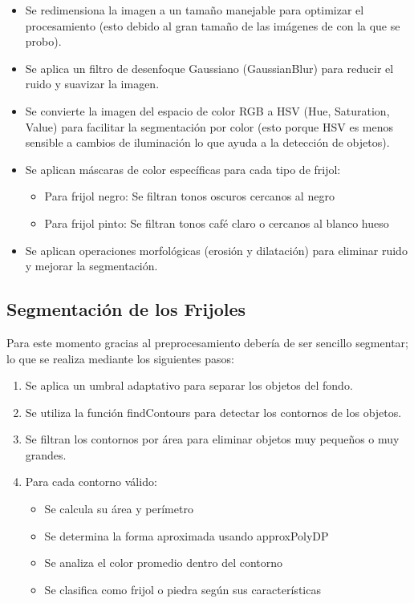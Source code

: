 \documentclass[conference]{IEEEtran}
\begin{document}
    \begin{itemize}
        \item Se redimensiona la imagen a un tamaño manejable para optimizar el procesamiento (esto debido al gran tamaño de las imágenes de con la que se probo).
        \item Se aplica un filtro de desenfoque Gaussiano (GaussianBlur) para reducir el ruido y suavizar la imagen\cite{gaussianblur}.
        \item Se convierte la imagen del espacio de color RGB a HSV\cite{rgbhsv} (Hue, Saturation, Value) para facilitar la segmentación por color (esto porque HSV es menos sensible a cambios de iluminación lo que ayuda a la detección de objetos).
        \item Se aplican máscaras de color específicas para cada tipo de frijol:
        \begin{itemize}
            \item Para frijol negro: Se filtran tonos oscuros cercanos al negro
            \item Para frijol pinto: Se filtran tonos café claro o cercanos al blanco hueso 
        \end{itemize}
        \item Se aplican operaciones morfológicas (erosión y dilatación) para eliminar ruido y mejorar la segmentación\cite{morfologico}.
    \end{itemize}

    \subsection{Segmentación de los Frijoles}
    
    Para este momento gracias al preprocesamiento debería de ser sencillo segmentar; lo que se realiza mediante los siguientes pasos:
    \begin{enumerate}
        \item Se aplica un umbral adaptativo para separar los objetos del fondo.
        \item Se utiliza la función findContours para detectar los contornos de los objetos.
        \item Se filtran los contornos por área para eliminar objetos muy pequeños o muy grandes.
        \item Para cada contorno válido:
        \begin{itemize}
            \item Se calcula su área y perímetro
            \item Se determina la forma aproximada usando approxPolyDP
            \item Se analiza el color promedio dentro del contorno
            \item Se clasifica como frijol o piedra según sus características
        \end{itemize}
    \end{enumerate}
\end{document}
